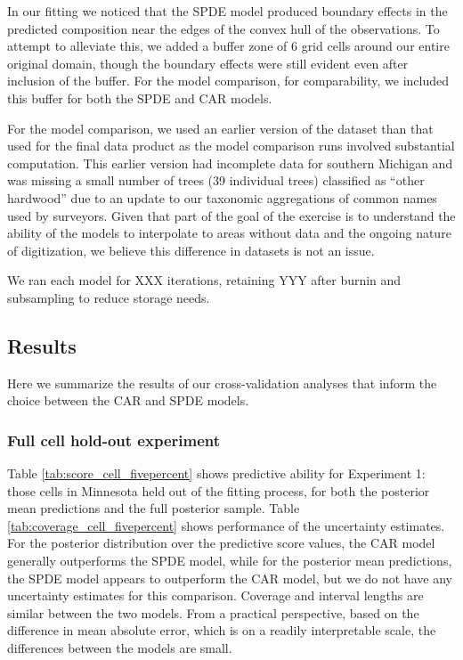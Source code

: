 \documentclass[12pt]{article}\usepackage[]{graphicx}\usepackage[]{color}
\begin{document}
In our fitting we noticed that the SPDE model produced boundary effects
in the predicted composition near the edges of the convex hull of
the observations. To attempt to alleviate this, we added a buffer
zone of 6 grid cells around our entire original domain, though the
boundary effects were still evident even after inclusion of the buffer.
For the model comparison, for comparability, we included this buffer
for both the SPDE and CAR models. 

For the model comparison, we used an earlier version of the dataset
than that used for the final data product as the model comparison
runs involved substantial computation. This earlier version had incomplete
data for southern Michigan and was missing a small number of trees
(39 individual trees) classified as ``other hardwood'' due to an
update to our taxonomic aggregations of common names used by surveyors.
Given that part of the goal of the exercise is to understand the ability
of the models to interpolate to areas without data and the ongoing
nature of digitization, we believe this difference in datasets is
not an issue.

We ran each model for XXX iterations, retaining YYY after burnin and
subsampling to reduce storage needs. 





\subsection{Results}

Here we summarize the results of our cross-validation analyses that
inform the choice between the CAR and SPDE models. 


\subsubsection{Full cell hold-out experiment}

Table \ref{tab:score_cell_fivepercent} shows predictive ability for
Experiment 1: those cells in Minnesota held out of the fitting process,
for both the posterior mean predictions and the full posterior sample.
Table \ref{tab:coverage_cell_fivepercent} shows performance of the
uncertainty estimates. For the posterior distribution over the predictive
score values, the CAR model generally outperforms the SPDE model,
while for the posterior mean predictions, the SPDE model appears to
outperform the CAR model, but we do not have any uncertainty estimates
for this comparison. Coverage and interval lengths are similar between
the two models. From a practical perspective, based on the difference
in mean absolute error, which is on a readily interpretable scale,
the differences between the models are small. 
\end{document}
